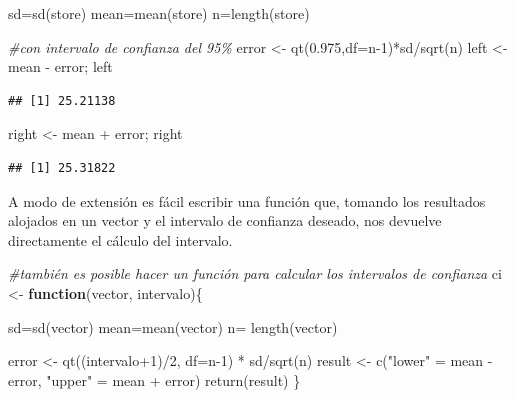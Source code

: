 \documentclass[
]{book}
\newenvironment{Shaded}{\begin{snugshade}}{\end{snugshade}}
\newcommand{\AttributeTok}[1]{\textcolor[rgb]{0.77,0.63,0.00}{#1}}
\newcommand{\CommentTok}[1]{\textcolor[rgb]{0.56,0.35,0.01}{\textit{#1}}}
\newcommand{\ControlFlowTok}[1]{\textcolor[rgb]{0.13,0.29,0.53}{\textbf{#1}}}
\newcommand{\DecValTok}[1]{\textcolor[rgb]{0.00,0.00,0.81}{#1}}
\newcommand{\FloatTok}[1]{\textcolor[rgb]{0.00,0.00,0.81}{#1}}
\newcommand{\FunctionTok}[1]{\textcolor[rgb]{0.00,0.00,0.00}{#1}}
\newcommand{\NormalTok}[1]{#1}
\newcommand{\OtherTok}[1]{\textcolor[rgb]{0.56,0.35,0.01}{#1}}
\newcommand{\SpecialCharTok}[1]{\textcolor[rgb]{0.00,0.00,0.00}{#1}}
\newcommand{\StringTok}[1]{\textcolor[rgb]{0.31,0.60,0.02}{#1}}
\begin{document}
\begin{Shaded}
\begin{Highlighting}[]
\NormalTok{sd}\OtherTok{=}\FunctionTok{sd}\NormalTok{(store)}
\NormalTok{mean}\OtherTok{=}\FunctionTok{mean}\NormalTok{(store)}
\NormalTok{n}\OtherTok{=}\FunctionTok{length}\NormalTok{(store)}

\CommentTok{\#con intervalo de confianza del 95\%}
\NormalTok{error }\OtherTok{\textless{}{-}} \FunctionTok{qt}\NormalTok{(}\FloatTok{0.975}\NormalTok{,}\AttributeTok{df=}\NormalTok{n}\DecValTok{{-}1}\NormalTok{)}\SpecialCharTok{*}\NormalTok{sd}\SpecialCharTok{/}\FunctionTok{sqrt}\NormalTok{(n)}
\NormalTok{left }\OtherTok{\textless{}{-}}\NormalTok{ mean }\SpecialCharTok{{-}}\NormalTok{ error; left}
\end{Highlighting}
\end{Shaded}

\begin{verbatim}
## [1] 25.21138
\end{verbatim}

\begin{Shaded}
\begin{Highlighting}[]
\NormalTok{right }\OtherTok{\textless{}{-}}\NormalTok{ mean }\SpecialCharTok{+}\NormalTok{ error; right}
\end{Highlighting}
\end{Shaded}

\begin{verbatim}
## [1] 25.31822
\end{verbatim}

A modo de extensión es fácil escribir una función que, tomando los resultados alojados en un vector y el intervalo de confianza deseado, nos devuelve directamente el cálculo del intervalo.

\begin{Shaded}
\begin{Highlighting}[]
\CommentTok{\#también es posible hacer un función para calcular los intervalos de confianza}
\NormalTok{ci }\OtherTok{\textless{}{-}} \ControlFlowTok{function}\NormalTok{(vector, intervalo)\{}
  
\NormalTok{  sd}\OtherTok{=}\FunctionTok{sd}\NormalTok{(vector)}
\NormalTok{  mean}\OtherTok{=}\FunctionTok{mean}\NormalTok{(vector)}
\NormalTok{  n}\OtherTok{=} \FunctionTok{length}\NormalTok{(vector)}
  
\NormalTok{  error }\OtherTok{\textless{}{-}} \FunctionTok{qt}\NormalTok{((intervalo}\SpecialCharTok{+}\DecValTok{1}\NormalTok{)}\SpecialCharTok{/}\DecValTok{2}\NormalTok{, }\AttributeTok{df=}\NormalTok{n}\DecValTok{{-}1}\NormalTok{) }\SpecialCharTok{*}\NormalTok{ sd}\SpecialCharTok{/}\FunctionTok{sqrt}\NormalTok{(n)}
\NormalTok{  result }\OtherTok{\textless{}{-}} \FunctionTok{c}\NormalTok{(}\StringTok{"lower"} \OtherTok{=}\NormalTok{ mean }\SpecialCharTok{{-}}\NormalTok{ error, }\StringTok{"upper"} \OtherTok{=}\NormalTok{ mean }\SpecialCharTok{+}\NormalTok{ error)}
  \FunctionTok{return}\NormalTok{(result)}
\NormalTok{\}}
\end{Highlighting}
\end{Shaded}
\end{document}
